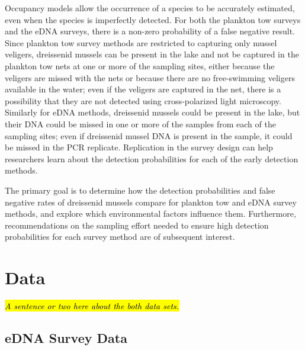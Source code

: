 \documentclass[12pt]{article}\usepackage[]{graphicx}\usepackage[]{color}
\begin{document}
Occupancy models allow the occurrence of a species to be accurately estimated, even when the species is imperfectly detected. For both the plankton tow surveys and the eDNA surveys, there is a non-zero probability of a false negative result. Since plankton tow survey methods are restricted to capturing only mussel veligers, dreissenid mussels can be present in the lake and not be captured in the plankton tow nets at one or more of the sampling sites, either because the veligers are missed with the nets or because there are no free-swimming veligers available in the water; even if the veligers are captured in the net, there is a possibility that they are not detected using cross-polarized light microscopy. Similarly for eDNA methods, dreissenid mussels could be present in the lake, but their DNA could be missed in one or more of the samples from each of the sampling sites; even if dreissenid mussel DNA is present in the sample, it could be missed in the PCR replicate. Replication in the survey design can help researchers learn about the detection probabilities for each of the early detection methods. 

The primary goal is to determine how the detection probabilities and false negative rates of dreissenid mussels compare for plankton tow and eDNA survey methods, and explore which environmental factors influence them. Furthermore, recommendations on the sampling effort needed to ensure high detection probabilities for each survey method are of subsequent interest. 

\section{Data}

\textit{\hl{A sentence or two here about the both data sets.}}

\subsection{eDNA Survey Data}
\end{document}
